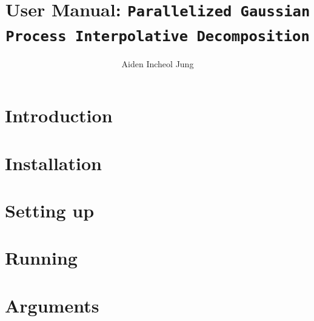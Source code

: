 \documentclass[11pt]{article}
\title{User Manual: \texttt{Parallelized Gaussian Process Interpolative Decomposition}}
\author{Aiden Incheol Jung}
\begin{document}
\maketitle

\section{Introduction}


\section{Installation}


\section{Setting up}


\section{Running}


\section{Arguments}

\end{document}
